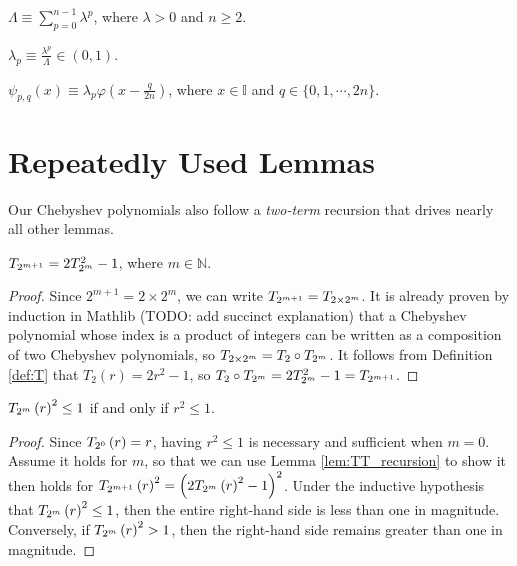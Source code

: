 \begin{definition}[Normalizer]
  \label{def:Lambda}
  $\Lambda \equiv \sum\limits_{p = 0}^{n - 1} \lambda^p$, where $\lambda > 0$ and $n \geq 2$.
\end{definition}
\begin{definition}
  \label{def:lambda_p}
  $\lambda_p \equiv \frac{\lambda^p}{\Lambda} \in \left(0,1\right)$.
\end{definition}
\begin{definition}
  \label{def:inner_function}
  $\psi_{p,q}\left(x\right) \equiv \lambda_p \varphi\left(x - \frac{q}{2n}\right)$, where $x \in \mathbb{I}$ and $q \in \{0, 1, \cdots, 2n\}$.
\end{definition}

\section{Repeatedly Used Lemmas}\label{sec:RepeatedlyUsedLemmas}

\renewcommand{\thetheorem}{\Alph{theorem}}

Our Chebyshev polynomials also follow a \emph{two-term} recursion that drives nearly all other lemmas.
\begin{lemma}
  \label{lem:TT_recursion}
  \leanok
  $\TT{m + 1} = 2\TT{m}^2 - 1$, where $m \in \mathbb{N}$.
\end{lemma}
  
\begin{proof}
  \leanok
  Since $2^{m + 1} = 2 \times 2^m$, we can write $\TT{m + 1} = T_{2 \times 2^m}$. It is already proven by induction in Mathlib (TODO: add succinct explanation) that a Chebyshev polynomial whose index is a product of integers can be written as a composition of two Chebyshev polynomials, so $T_{2 \times 2^m} = T_2 \circ \TT{m}$. It follows from Definition \ref{def:T} that $T_2\left(r\right) = 2r^2 - 1$, so $T_2 \circ \TT{m} = 2\TT{m}^2 - 1 = \TT{m + 1}$.
\end{proof}

\begin{lemma}[Bounds]
  \label{lem:bounds}
  $\TT[r]{m}^2 \leq 1$ if and only if $r^2 \leq 1$.
\end{lemma}
\begin{proof}
  Since $\TT[r]{0} = r$, having $r^2 \leq 1$ is necessary and sufficient when $m = 0$. Assume it holds for $m$, so that we can use Lemma \ref{lem:TT_recursion} to show it then holds for $\TT[r]{m + 1}^2 = \left(2\TT[r]{m}^2 - 1\right)^2$. Under the inductive hypothesis that $\TT[r]{m}^2 \leq 1$, then the entire right-hand side is less than one in magnitude. Conversely, if $\TT[r]{m}^2 > 1$, then the right-hand side remains greater than one in magnitude.
\end{proof}

